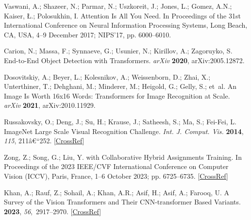 \documentclass[12pt,a4paper,oneside]{report}
\begin{document}
\begin{thebibliography}{999}
Vaswani, A.; Shazeer, N.; Parmar, N.; Uszkoreit, J.; Jones, L.; Gomez, A.N.;
Kaiser, {\L}.; Polosukhin, I.
\newblock Attention Is All You Need.
\newblock In Proceedings of the 31st International Conference on Neural Information Processing Systems, Long Beach, CA, USA, 4--9 December 2017; {{NIPS}}'17, pp. 6000--6010.

Carion, N.; Massa, F.; Synnaeve, G.; Usunier, N.; Kirillov, A.; Zagoruyko, S.
\newblock End-to-{{End Object Detection}} with {{Transformers}}. {\em arXiv} {\bf 2020}, arXiv:2005.12872.

Dosovitskiy, A.; Beyer, L.; Kolesnikov, A.; Weissenborn, D.; Zhai, X.;
Unterthiner, T.; Dehghani, M.; Minderer, M.; Heigold, G.; Gelly, S.;  et~al.
\newblock An {{Image}} Is {{Worth}} 16x16 {{Words}}: {{Transformers}} for
{{Image Recognition}} at {{Scale}}. {\em arXiv} {\bf 2021}, arXiv:2010.11929.

Russakovsky, O.; Deng, J.; Su, H.; Krause, J.; Satheesh, S.; Ma, S.; Fei-Fei, L. ImageNet Large Scale Visual Recognition Challenge. {\em Int. J. Comput. Vis.} {\bf 2014}, {\em 115}, 211â€“252.
 [\href{http://dx.doi.org/10.1007/s11263-015-0816-y}{CrossRef}]

Zong, Z.; Song, G.; Liu, Y.
 with {{Collaborative Hybrid Assignments Training}}.
\newblock In Proceedings of the 2023 {{IEEE}}/{{CVF International Conference}}
on {{Computer Vision}} ({{ICCV}}), Paris, France, 1--6 October 2023; pp. 6725--6735. [\href{http://dx.doi.org/10.1109/ICCV51070.2023.00621}{CrossRef}]

Khan, A.; Rauf, Z.; Sohail, A.; Khan, A.R.; Asif, H.; Asif, A.; Farooq, U.
\newblock A Survey of the Vision Transformers and Their {{CNN-transformer}}
Based Variants.
 {\bf 2023}, {\em
56},~2917--2970. [\href{http://dx.doi.org/10.1007/s10462-023-10595-0}{CrossRef}]


\end{thebibliography}
\end{document}
